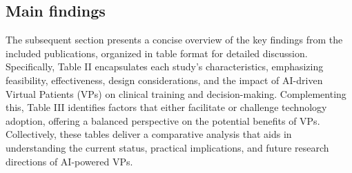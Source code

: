 \subsection{Main findings}

The subsequent section presents a concise overview of the key findings from the included publications, organized in table format for detailed discussion. Specifically, Table II encapsulates each study's characteristics, emphasizing feasibility, effectiveness, design considerations, and the impact of AI-driven Virtual Patients (VPs) on clinical training and decision-making. Complementing this, Table III identifies factors that either facilitate or challenge technology adoption, offering a balanced perspective on the potential benefits of VPs. Collectively, these tables deliver a comparative analysis that aids in understanding the current status, practical implications, and future research directions of AI-powered VPs.

